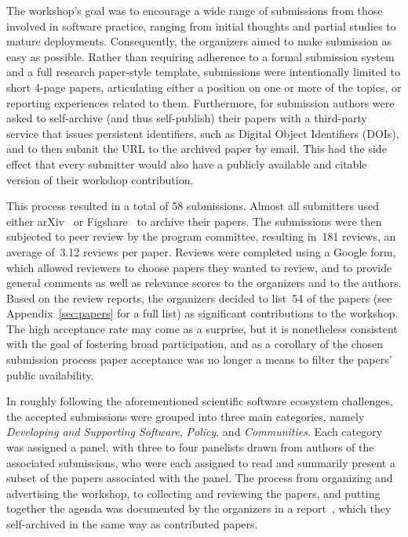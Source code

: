\documentclass[11pt, oneside]{amsart}
\begin{document}
The workshop's goal was to encourage a wide range of submissions from
those involved in software practice, ranging from initial thoughts and
partial studies to mature deployments. Consequently, the organizers
aimed to make submission as easy as possible. Rather than requiring
adherence to a formal submission system and a full research
paper-style template, submissions were intentionally limited to short
4-page papers, articulating either a position on one or more of the
topics, or reporting experiences related to them. Furthermore, for
submission authors were asked to self-archive (and thus self-publish)
their papers with a third-party service that issues persistent
identifiers, such as Digital Object Identifiers (DOIs), and to then
submit the URL to the archived paper by email. This had the side
effect that every submitter would also have a publicly available and
citable version of their workshop contribution.

This process resulted in a total of 58 submissions. Almost all
submitters used either arXiv~\cite{arXiv-web} or
Figshare~\cite{figshare-web} to archive their papers. The submissions
were then subjected to peer review by the program committee, resulting
in~181 reviews, an average of~3.12 reviews per paper. Reviews were
completed using a Google form, which allowed reviewers to choose
papers they wanted to review, and to provide general comments as well
as relevance scores to the organizers and to the authors. Based on the
review reports, the organizers decided to list~54 of the papers (see
Appendix~\ref{sec:papers} for a full list) as significant
contributions to the workshop. The high acceptance rate may come as a
surprise, but it is nonetheless consistent with the goal of fostering
broad participation, and as a corollary of the chosen submission
process paper acceptance was no longer a means to filter the papers'
public availability.

In roughly following the aforementioned scientific software ecosystem
challenges, the accepted submissions were grouped into three main
categories, namely \emph{Developing and Supporting Software},
\emph{Policy}, and \emph{Communities}. Each category was assigned a
panel, with three to four panelists drawn from authors of the
associated submissions, who were each assigned to read and summarily
present a subset of the papers associated with the panel. The process
from organizing and advertising the workshop, to collecting and
reviewing the papers, and putting together the agenda was documented
by the organizers in a report~\cite{WSSSPE1-pre-report}, which they
self-archived in the same way as contributed papers.
\end{document}
